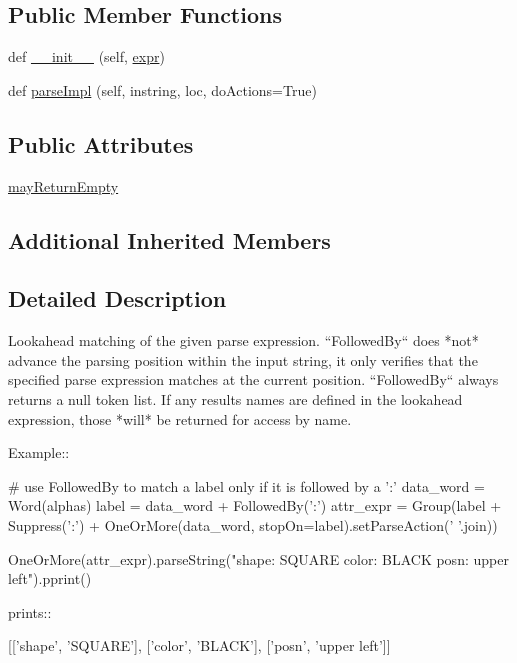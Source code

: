 \subsection*{Public Member Functions}
\begin{DoxyCompactItemize}
\item 
def \hyperlink{classpip_1_1__vendor_1_1pyparsing_1_1FollowedBy_a688b488206de4531072833e452cf5ca1}{\+\_\+\+\_\+init\+\_\+\+\_\+} (self, \hyperlink{classpip_1_1__vendor_1_1pyparsing_1_1ParseElementEnhance_af574b49a0a7d914693fdaa833df7098f}{expr})
\item 
def \hyperlink{classpip_1_1__vendor_1_1pyparsing_1_1FollowedBy_ad084867c0f85f4251113d4151e83503c}{parse\+Impl} (self, instring, loc, do\+Actions=True)
\end{DoxyCompactItemize}
\subsection*{Public Attributes}
\begin{DoxyCompactItemize}
\item 
\hyperlink{classpip_1_1__vendor_1_1pyparsing_1_1FollowedBy_a202b4cdaafda86bb1046f1d317aa7e0a}{may\+Return\+Empty}
\end{DoxyCompactItemize}
\subsection*{Additional Inherited Members}


\subsection{Detailed Description}
\begin{DoxyVerb}Lookahead matching of the given parse expression.
``FollowedBy`` does *not* advance the parsing position within
the input string, it only verifies that the specified parse
expression matches at the current position.  ``FollowedBy``
always returns a null token list. If any results names are defined
in the lookahead expression, those *will* be returned for access by
name.

Example::

    # use FollowedBy to match a label only if it is followed by a ':'
    data_word = Word(alphas)
    label = data_word + FollowedBy(':')
    attr_expr = Group(label + Suppress(':') + OneOrMore(data_word, stopOn=label).setParseAction(' '.join))

    OneOrMore(attr_expr).parseString("shape: SQUARE color: BLACK posn: upper left").pprint()

prints::

    [['shape', 'SQUARE'], ['color', 'BLACK'], ['posn', 'upper left']]
\end{DoxyVerb}
 


